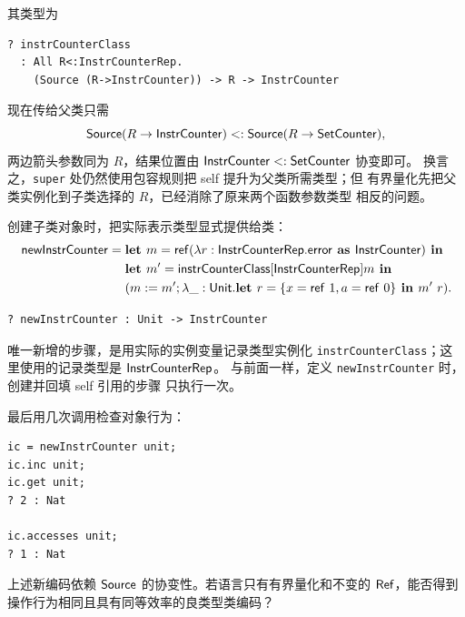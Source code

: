 其类型为
\begin{lstlisting}
? instrCounterClass
  : All R<:InstrCounterRep.
    (Source (R->InstrCounter)) -> R -> InstrCounter
\end{lstlisting}
现在传给父类只需
\[
\mathsf{Source}(R\to\mathsf{InstrCounter})
<:\mathsf{Source}(R\to\mathsf{SetCounter}),
\]
两边箭头参数同为 \(R\)，结果位置由
\(\mathsf{InstrCounter}<:\mathsf{SetCounter}\) 协变即可。
换言之，\texttt{super} 处仍然使用包容规则把 self 提升为父类所需类型；但
有界量化先把父类实例化到子类选择的 \(R\)，已经消除了原来两个函数参数类型
相反的问题。

创建子类对象时，把实际表示类型显式提供给类：
\[
\begin{aligned}
\mathsf{newInstrCounter}={}&
\textbf{let }m=\mathsf{ref}
(\lambda r:\mathsf{InstrCounterRep}.
\mathsf{error}\textbf{ as }\mathsf{InstrCounter})\textbf{ in}\\
&\textbf{let }m'=
\mathsf{instrCounterClass}[\mathsf{InstrCounterRep}]m\textbf{ in}\\
&(m:=m';\lambda\_:\mathsf{Unit}.
\textbf{let }r=\{x=\mathsf{ref}\ 1,a=\mathsf{ref}\ 0\}
\textbf{ in }m'\ r).
\end{aligned}
\]
\begin{lstlisting}
? newInstrCounter : Unit -> InstrCounter
\end{lstlisting}
唯一新增的步骤，是用实际的实例变量记录类型实例化
\texttt{instrCounterClass}；这里使用的记录类型是 \(\mathsf{InstrCounterRep}\)。
与前面一样，定义 \texttt{newInstrCounter} 时，创建并回填 self 引用的步骤
只执行一次。

最后用几次调用检查对象行为：
\begin{lstlisting}
ic = newInstrCounter unit;
ic.inc unit;
ic.get unit;
? 2 : Nat

ic.accesses unit;
? 1 : Nat
\end{lstlisting}


\begin{chapterexercise}
\label{ex:27.1}
上述新编码依赖 \(\mathsf{Source}\) 的协变性。若语言只有有界量化和不变的
\(\mathsf{Ref}\)，能否得到操作行为相同且具有同等效率的良类型类编码？
\end{chapterexercise}
